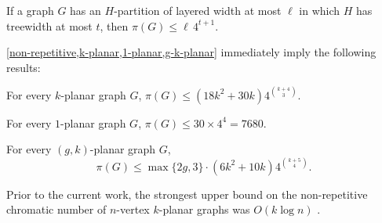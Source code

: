 \documentclass{patmorin}
\renewcommand{\ge}{\geqslant}
\renewcommand{\le}{\leqslant}
\begin{document}

\begin{lem}
\label{non-repetitive}
If a graph $G$ has an $H$-partition of layered width at most $\ell$ in which $H$ has treewidth at most $t$, then $\pi(G)\le \ell\, 4^{t+1}$.
\end{lem}


\cref{non-repetitive,k-planar,1-planar,g-k-planar} immediately imply the following results:


\begin{cor}
  For every $k$-planar graph $G$, 
  $\pi(G)\le (18k^2 + 30k) 4^{\binom{k+4}{3}}$.
\end{cor}

\begin{cor}
  For every $1$-planar graph $G$, $\pi(G)\le 30\times 4^4=7680$. 
\end{cor}

\begin{cor}
  For every $(g,k)$-planar graph $G$, 
  \[ 
    \pi(G)\le \max\{2g,3\}\cdot(6k^2 + 10k) 4^{\binom{k+5}{4}}. 
     \]
\end{cor}



Prior to the current work, the strongest upper bound on the non-repetitive chromatic number of $n$-vertex  $k$-planar graphs was $O(k\log n)$ \cite{dujmovic.morin.ea:layered}.
\end{document}
